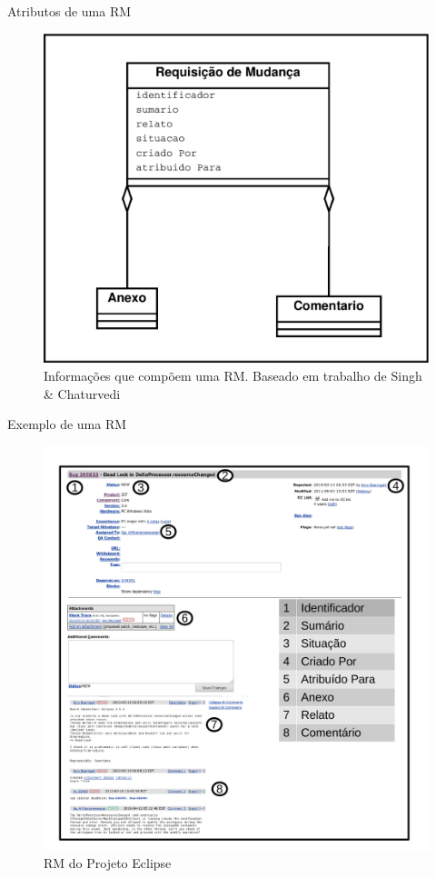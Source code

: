 \documentclass[t,14pt,mathserif]{beamer}
\begin{document}
\begin{frame}{Atributos de uma RM}

    \begin{figure}[htpb]
        \centering
        \includegraphics[width=0.55\linewidth]{../img/diagrama-classe-atributos-requisicao-mudancas.pdf}
        \caption{Informações que compõem uma RM\@. Baseado em trabalho de Singh \&
            Chaturvedi~\cite{singh2011bug}}
\label{fig:diagrama-classe-atributos-requisicao-mudancas}
    \end{figure}

\end{frame}

\begin{frame}{Exemplo de uma RM}

    \begin{figure}[htpb]
        \centering
        \includegraphics[width=0.55\linewidth]{../img/rm-exemplo.pdf}
        \caption{RM do Projeto Eclipse}
\label{fig:rm-exemplo}
    \end{figure}

\end{frame}
\end{document}
